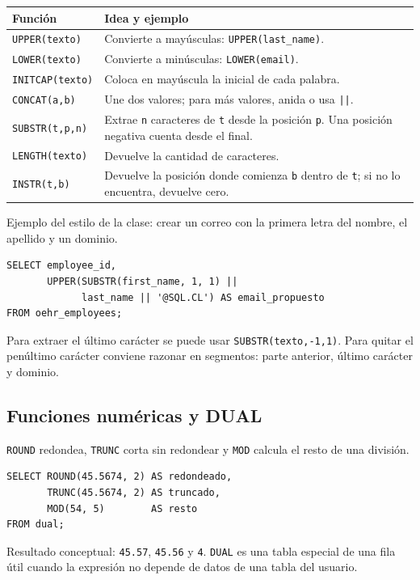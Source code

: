 \documentclass[11pt,a4paper]{article}
\newcommand{\campo}[1]{\texttt{#1}}
\newcommand{\tabla}[1]{\texttt{#1}}
\begin{document}
\begin{longtable}{p{} p{}}
\toprule
\textbf{Función} & \textbf{Idea y ejemplo} \\
\midrule
\endhead
\campo{UPPER(texto)} & Convierte a mayúsculas: \campo{UPPER(last\_name)}. \\
\campo{LOWER(texto)} & Convierte a minúsculas: \campo{LOWER(email)}. \\
\campo{INITCAP(texto)} & Coloca en mayúscula la inicial de cada palabra. \\
\campo{CONCAT(a,b)} & Une dos valores; para más valores, anida o usa \campo{||}. \\
\campo{SUBSTR(t,p,n)} & Extrae \campo{n} caracteres de \campo{t} desde la posición \campo{p}. Una
posición negativa cuenta desde el final. \\
\campo{LENGTH(texto)} & Devuelve la cantidad de caracteres. \\
\campo{INSTR(t,b)} & Devuelve la posición donde comienza \campo{b} dentro de \campo{t}; si no lo
encuentra, devuelve cero. \\
\bottomrule
\end{longtable}

Ejemplo del estilo de la clase: crear un correo con la primera letra del nombre, el apellido y un
dominio.

\begin{lstlisting}
SELECT employee_id,
       UPPER(SUBSTR(first_name, 1, 1) ||
             last_name || '@SQL.CL') AS email_propuesto
FROM oehr_employees;
\end{lstlisting}

Para extraer el último carácter se puede usar \campo{SUBSTR(texto,-1,1)}. Para quitar el penúltimo
carácter conviene razonar en segmentos: parte anterior, último carácter y dominio.

\subsection{Funciones numéricas y DUAL}

\campo{ROUND} redondea, \campo{TRUNC} corta sin redondear y \campo{MOD} calcula el resto de una
división.

\begin{lstlisting}
SELECT ROUND(45.5674, 2) AS redondeado,
       TRUNC(45.5674, 2) AS truncado,
       MOD(54, 5)        AS resto
FROM dual;
\end{lstlisting}

Resultado conceptual: \campo{45.57}, \campo{45.56} y \campo{4}. \tabla{DUAL} es una tabla especial
de una fila útil cuando la expresión no depende de datos de una tabla del usuario.
\end{document}
